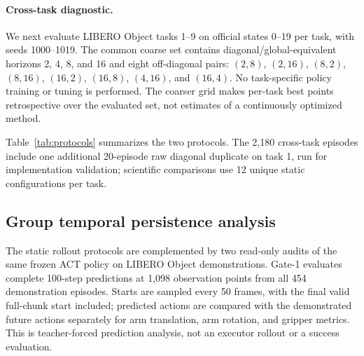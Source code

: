 \paragraph{Cross-task diagnostic.}

We next evaluate LIBERO Object tasks 1--9 on official states 0--19 per task,
with seeds 1000--1019.  The common coarse set contains diagonal/global-equivalent
horizons 2, 4, 8, and 16 and eight off-diagonal pairs:
$(2,8)$, $(2,16)$, $(8,2)$, $(8,16)$, $(16,2)$, $(16,8)$,
$(4,16)$, and $(16,4)$.  No task-specific policy training or tuning is performed.
The coarser grid makes per-task best points retrospective over the evaluated set,
not estimates of a continuously optimized method.

Table~\ref{tab:protocols} summarizes the two protocols.  The 2,180 cross-task
episodes include one additional 20-episode raw diagonal duplicate on task 1,
run for implementation validation; scientific comparisons use 12 unique static
configurations per task.

\begin{table}[t]
\caption{Evaluation protocols and configuration accounting.  Task 0 uses five
global and 25 group-specific configurations, with five diagonal group-specific
entries duplicating the corresponding global semantics as controls.  Cross-task
comparisons use 12 unique static configurations per task plus one additional
20-episode raw diagonal duplicate on task 1 for implementation validation
(2,180 rollouts total).}
\label{tab:protocols}
\centering
\scriptsize
\setlength{\tabcolsep}{3.0pt}
%
\end{table}

\subsection{Group temporal persistence analysis}

The static rollout protocols are complemented by two read-only audits of the
same frozen ACT policy on LIBERO Object demonstrations.  Gate-1 evaluates
complete 100-step predictions at 1,098 observation points from all 454
demonstration episodes.  Starts are sampled every 50 frames, with the final
valid full-chunk start included; predicted actions are compared with the
demonstrated future actions separately for arm translation, arm rotation, and
gripper metrics.  This is teacher-forced prediction analysis, not an executor
rollout or a success evaluation.

